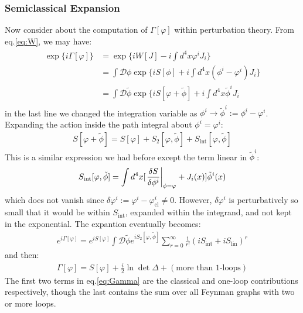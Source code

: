 \subsubsection{Semiclassical Expansion}
Now consider about the computation of $\Gamma[\varphi]$ within perturbation theory. From eq.\ref{eq:W}, we may have:
\begin{align}
    \begin{split}
        \exp \lbrace i\Gamma[\varphi]\rbrace &= \exp \lbrace iW[J] - i\int d^{4}x \varphi^{i} J_{i} \rbrace \\
        &= \int \mathcal{D} \phi \exp \lbrace iS[\phi] + i \int d^{4}x (\phi ^{i} - \varphi ^{i})J_{i} \rbrace \\
        &= \int \mathcal{D} \tilde{\phi} \exp \lbrace iS[\varphi + \tilde{\phi}]+ i\int d^{4}x \tilde{\phi} ^{i} J_{i}
    \end{split}
\end{align}
in the last line we changed the integration variable as $\phi ^{i} \rightarrow \tilde{\phi}^{i} := \phi ^{i} - \varphi ^{i}$. Expanding the action inside the path integral about $\phi^{i} = \varphi ^{i}$:
\begin{align}
    S[\varphi + \tilde{\phi}] = S[\varphi] + S_{2} [\varphi, \tilde{\phi}] + S_{\text{int}}[\varphi,\tilde{\phi}]
\end{align}
This is a similar expression we had before except the term linear in $\tilde{\phi}^{i}$:
\begin{align}
    S_{\text{int}}[\varphi,\tilde{\phi}] = \int d^{4}x [\eval{\fdv{S}{\phi^{i}}(x)}_{\phi=\varphi} + J_{i}(x)] \tilde{\phi}^{i}(x)
\end{align}
which does not vanish since $\delta \varphi^{i} := \varphi ^{i} - \varphi_{\text{cl}}^{i} \neq 0$. However, $\delta\varphi^{i}$ is perturbatively so small that it would be within $S_{\text{int}}$, expanded within the integrand, and not kept in the exponential. The expantion eventually becomes:
\begin{align}
    e^{i\Gamma[\varphi]} = e^{iS[\varphi]} \int \mathcal{D}\tilde{\phi} e^{iS_{2}[\varphi,\tilde{\phi}]}\sum _{r=0}^{\infty} \frac{1}{r!}(iS_{\text{int}}+ i S_{\text{lin}})^{r}
\end{align}
and then:
\begin{align}
    \label{eq:Gamma}
    \Gamma[\varphi] = S[\varphi] + \frac{i}{2}\ln \det \Delta + (\text{more than 1-loops})
\end{align}
The first two terms in eq.\ref{eq:Gamma} are the classical and one-loop contributions respectively, though the last contains the sum over all Feynman graphs with two or more loops. \\
